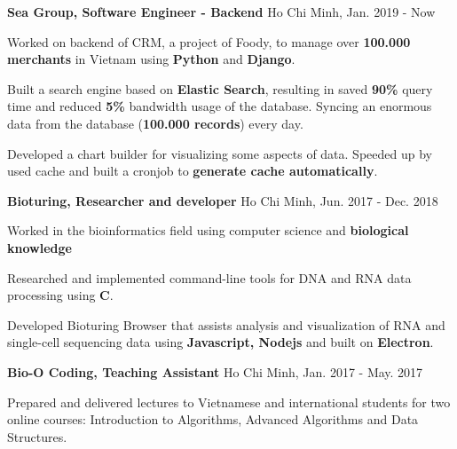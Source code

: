 

\begin{cventries}

  \cvsimpleentry
    {\textbf{Sea Group, Software Engineer - Backend}} %
    {Ho Chi Minh, Jan. 2019 - Now} %
    {
      \begin{cvitems} %
        \item {Worked on backend of CRM, a project of Foody, to manage over \textbf{100.000 merchants} in Vietnam using \textbf{Python} and \textbf{Django}.}
        \item {Built a search engine based on \textbf{Elastic Search}, resulting in saved \textbf{90\%} query time and reduced \textbf{5\%} bandwidth usage of the database. Syncing an enormous data from the database (\textbf{100.000 records}) every day.}
        \item {Developed a chart builder for visualizing some aspects of data. Speeded up by used cache and built a cronjob to \textbf{generate cache automatically}.}
      \end{cvitems}
    }

  \cvsimpleentry
    {\textbf{Bioturing, Researcher and developer}} %
    {Ho Chi Minh, Jun. 2017 - Dec. 2018} %
    {
      \begin{cvitems} %
        \item {Worked in the bioinformatics field using computer science and \textbf{biological knowledge}}
        \item {Researched and implemented command-line tools for DNA and RNA data processing using \textbf{C}.}
        \item {Developed Bioturing Browser that assists analysis and visualization of RNA and single-cell sequencing data using \textbf{Javascript, Nodejs} and built on \textbf{Electron}.}
      \end{cvitems}
    }

  \cvsimpleentry
    {\textbf{Bio-O Coding, Teaching Assistant}} %
    {Ho Chi Minh, Jan. 2017 - May. 2017} %
    {
      \begin{cvitems} %
        \item {Prepared and delivered lectures to Vietnamese and international students for two online courses: Introduction to Algorithms, Advanced Algorithms and Data Structures.}
      \end{cvitems}
    }

\end{cventries}

